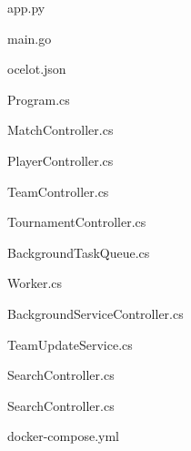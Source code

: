 \newsection
{}

app.py


main.go


ocelot.json


Program.cs


MatchController.cs


PlayerController.cs


TeamController.cs


TournamentController.cs


BackgroundTaskQueue.cs


Worker.cs


BackgroundServiceController.cs


TeamUpdateService.cs


SearchController.cs


SearchController.cs


docker-compose.yml


\newsection
{} %